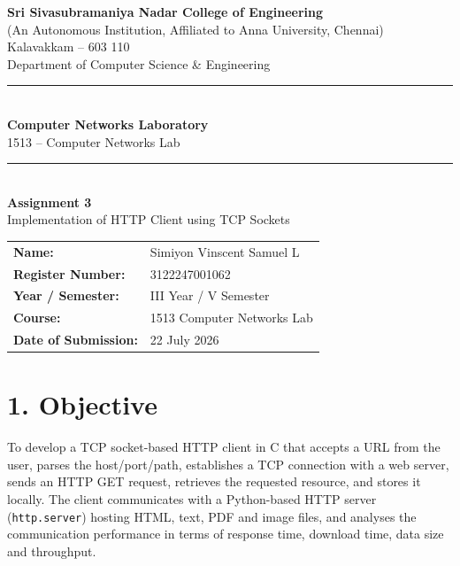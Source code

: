 \documentclass[11pt]{article}
\title{\vspace{-2cm}}
\date{}
\begin{document}
\begin{titlepage}
\centering
\vspace*{1cm}
{\large \textbf{Sri Sivasubramaniya Nadar College of Engineering}}\\
{\small (An Autonomous Institution, Affiliated to Anna University, Chennai)}\\
{\small Kalavakkam -- 603 110}\\[0.3cm]
{\small Department of Computer Science \& Engineering}\\[1.5cm]

\rule{\linewidth}{0.5mm}\\[0.4cm]
{\LARGE \textbf{Computer Networks Laboratory}}\\[0.3cm]
{\Large 1513 -- Computer Networks Lab}\\[0.4cm]
\rule{\linewidth}{0.5mm}\\[1.5cm]

{\huge \textbf{Assignment 3}}\\[0.4cm]
{\Large Implementation of HTTP Client using TCP Sockets}\\[2cm]

\begin{center}
\begin{tabular}{ll}
\textbf{Name:} & Simiyon Vinscent Samuel L \\[0.2cm]
\textbf{Register Number:} & 3122247001062 \\[0.2cm]
\textbf{Year / Semester:} & III Year / V Semester \\[0.2cm]
\textbf{Course:} & 1513 Computer Networks Lab \\[0.2cm]
\textbf{Date of Submission:} & 22 July 2026 \\[0.2cm]
\end{tabular}
\end{center}

\vfill
\end{titlepage}

\section*{1. Objective}
To develop a TCP socket-based HTTP client in C that accepts a URL from the user, parses the
host/port/path, establishes a TCP connection with a web server, sends an HTTP GET request,
retrieves the requested resource, and stores it locally. The client communicates with a
Python-based HTTP server (\texttt{http.server}) hosting HTML, text, PDF and image files, and
analyses the communication performance in terms of response time, download time, data size and
throughput.
\end{document}
